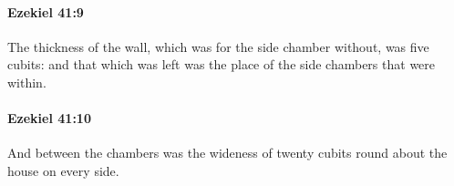 		\paragraph{Ezekiel 41:9} %
			\label{EZEKIEL-41-9}

			The thickness of the wall, which was for the side chamber without, was five cubits: and that which was left was the place of the side chambers that were within.


		\paragraph{Ezekiel 41:10} %
			\label{EZEKIEL-41-10}

			And between the chambers was the wideness of twenty cubits round about the house on every side.


